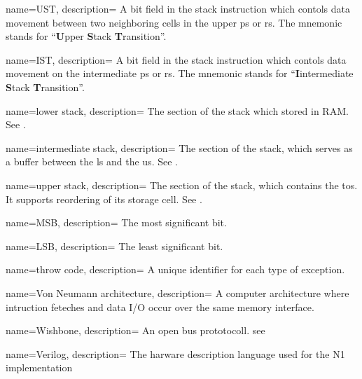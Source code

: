  {
    name={UST},
    description={
      A bit field in the stack instruction which contols data movement
      between two neighboring \glspl{cell} in the upper \gls{ps} or \gls{rs}.
      The mnemonic stands for ``\textbf{U}pper \textbf{S}tack \textbf{T}ransition''.
      \nopostdesc
    }
}

 {
    name={IST},
    description={
      A bit field in the stack instruction which contols data movement
      on the intermediate \gls{ps} or \gls{rs}.
      The mnemonic stands for
      ``\textbf{I}intermediate \textbf{S}tack \textbf{T}ransition''.
      \nopostdesc
    }
}

 {
    name={lower stack},
    description={
      The section of the stack which stored in RAM.
      See . 
      \nopostdesc
    }
}

 {
    name={intermediate stack},
    description={
      The section of the stack, which serves as a buffer between the
      \gls{ls} and the \gls{us}.
      See . 
      \nopostdesc
    }
}

 {
    name={upper stack},
    description={
      The section of the stack, which contains the \gls{tos}. It supports
      reordering of its storage \gls{cell}.
      See . 
      \nopostdesc
    }
}

 {
    name={MSB},
    description={
      The most significant bit.
      \nopostdesc
    }
}

 {
    name={LSB},
    description={
      The least significant bit.
      \nopostdesc
    }
}

 {
    name={throw code},
    description={
      A unique identifier for each type of exception.
      \nopostdesc
    }
}

 {
    name={Von Neumann architecture},
    description={
      A computer architecture where intruction feteches and data I/O occur
      over the same memory interface.
      \nopostdesc
    }
}

 {
    name={Wishbone},
    description={
      An open bus prototocoll. see \cite{wishbone}
      \nopostdesc
    }
}

 {
    name={Verilog},
    description={
      The harware description language used for the N1 implementation
      \nopostdesc
    }
}



